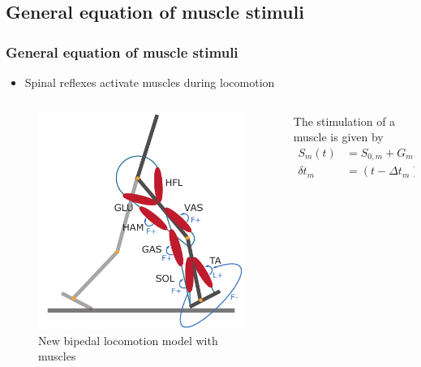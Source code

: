 \documentclass[10pt]{beamer}
\begin{document}
	\subsection[Methodology]{General equation of muscle stimuli}
	\begin{frame}
		\frametitle{General equation of muscle stimuli}
		\begin{itemize}
			\item Spinal reflexes activate muscles during locomotion
		\end{itemize}
		
		\begin{columns}
			\begin{column}{.5\textwidth}
				\begin{figure}
					\centering
					\includegraphics[height=.45\textheight]{images/new_model/stance/muscle_all.pdf}
					\caption{New bipedal locomotion model with muscles}	
				\end{figure}
			\end{column}
			\begin{column}{.5\textwidth}
				\begin{block}{}
					The stimulation of a muscle is given by
					\begin{align*}
						S_{m}(t)&=S_{0,m} + G_{m} F_{m} \delta t_m,  \\
						\delta t_m &= (t-\Delta t_{m}),
					\end{align*}

\end{block}
\end{column}
\end{columns}
\end{frame}
\end{document}
